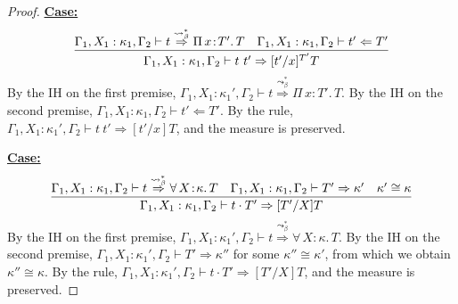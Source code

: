 \documentclass{article}
\newcommand{\abs}[4]{{#1}\, #2\! : \! #3.\, #4}
\newcommand{\tpcheck}[0]{\Leftarrow}
\newcommand{\tpsynth}[0]{\Rightarrow}
\newcommand{\tpsynthleads}[0]{\ensuremath{\overset{\leadsto_\beta^*}{\Rightarrow}}}
\newcommand{\startcase}[1]{\vspace{#1} \noindent\textbf{\underline{Case:}}}
\begin{document}
\begin{proof}
  \startcase{.2cm}
  \[
    \infer{
      \Gamma_1,X_1:\kappa_1,\Gamma_2 \vdash t\ t' \tpsynth [t'/x]^{T'}T
    }{
      \Gamma_1,X_1:\kappa_1,\Gamma_2 \vdash t \tpsynthleads \abs{\Pi}{x}{T'}{T}
      & \Gamma_1,X_1:\kappa_1,\Gamma_2\vdash t' \tpcheck T'
    }
  \]
  By the IH on the first premise, \(\Gamma_1,X_1:\kappa_1',\Gamma_2 \vdash t
  \tpsynthleads \abs{\Pi}{x}{T'}{T}\).
  By the IH on the second premise, \(\Gamma_1,X_1:\kappa_1,\Gamma_2 \vdash t'
  \tpcheck T'\).
  By the rule, \(\Gamma_1,X_1:\kappa_1',\Gamma_2 \vdash t\ t' \tpsynth [t'/x]T\),
  and the measure is preserved.
  
  \startcase{.2cm}
  \[
    \infer{
      \Gamma_1,X_1:\kappa_1,\Gamma_2 \vdash t \cdot T' \tpsynth [T'/X]T
    }{
      \Gamma_1,X_1:\kappa_1,\Gamma_2 \vdash t \tpsynthleads
      \abs{\forall}{X}{\kappa}{T}
      & \Gamma_1,X_1:\kappa_1,\Gamma_2 \vdash T' \tpsynth \kappa'
      & \kappa'\cong\kappa
    }
  \]
  By the IH on the first premise, \(\Gamma_1,X_1:\kappa_1',\Gamma_2 \vdash t
  \tpsynthleads \abs{\forall}{X}{\kappa}{T}\).
  By the IH on the second premise, \(\Gamma_1,X_1:\kappa_1',\Gamma_2 \vdash T'
  \tpsynth \kappa''\) for some \(\kappa'' \cong \kappa'\), from which we obtain
  \(\kappa'' \cong \kappa\).
  By the rule, \(\Gamma_1,X_1:\kappa_1',\Gamma_2 \vdash t \cdot T' \tpsynth
  [T'/X]T\), and the measure is preserved.
\end{proof}
\end{document}
